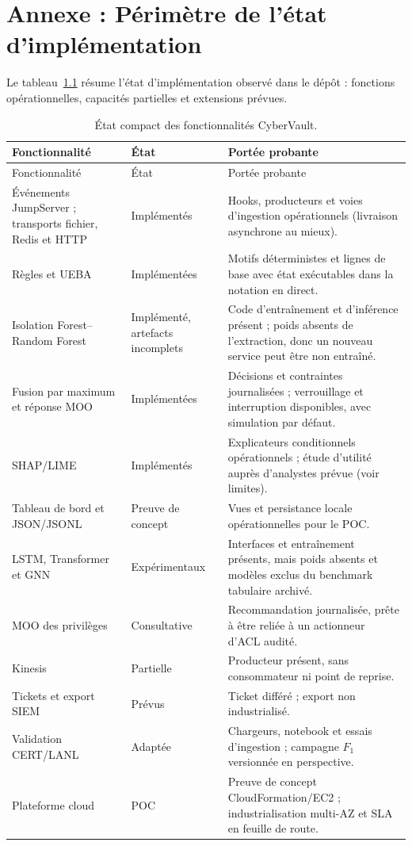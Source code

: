 \documentclass[11pt,a4paper,oneside]{report}
\theoremstyle{definition}
\theoremstyle{plain}
\begin{document}
\label{app:confusion-counts}
\label{tab:app-confusion}

\chapter{Annexe : Périmètre de l'état d'implémentation}
\label{app:status}

Le tableau~\ref{tab:app-status} résume l'état d'implémentation observé dans le
dépôt : fonctions opérationnelles, capacités partielles et extensions prévues.

\begin{longtable}{@{}p{}p{}p{}@{}}
\caption{État compact des fonctionnalités CyberVault.}
\label{tab:app-status}\\
\toprule
Fonctionnalité & État & Portée probante \\
\midrule
\endfirsthead
\toprule
Fonctionnalité & État & Portée probante \\
\midrule
\endhead
Événements JumpServer ; transports fichier, Redis et HTTP &
Implémentés & Hooks, producteurs et voies d'ingestion opérationnels (livraison
asynchrone au mieux). \\
Règles et UEBA & Implémentées & Motifs déterministes et lignes de base avec
état exécutables dans la notation en direct. \\
Isolation Forest--Random Forest & Implémenté, artefacts incomplets & Code
d'entraînement et d'inférence présent ; poids absents de l'extraction, donc un
nouveau service peut être non entraîné. \\
Fusion par maximum et réponse MOO & Implémentées & Décisions et contraintes
journalisées ; verrouillage et interruption disponibles, avec simulation par
défaut. \\
SHAP/LIME & Implémentés & Explicateurs conditionnels opérationnels ; étude
d'utilité auprès d'analystes prévue (voir limites). \\
Tableau de bord et JSON/JSONL & Preuve de concept & Vues et persistance locale
opérationnelles pour le POC. \\
LSTM, Transformer et GNN & Expérimentaux & Interfaces et entraînement présents,
mais poids absents et modèles exclus du benchmark tabulaire archivé. \\
MOO des privilèges & Consultative & Recommandation journalisée, prête à être
reliée à un actionneur d'ACL audité. \\
Kinesis & Partielle & Producteur présent, sans consommateur ni point de reprise. \\
Tickets et export SIEM & Prévus & Ticket différé ; export non industrialisé. \\
Validation CERT/LANL & Adaptée & Chargeurs, notebook et essais d'ingestion ;
campagne $F_1$ versionnée en perspective. \\
Plateforme cloud & POC & Preuve de concept CloudFormation/EC2 ; industrialisation
multi-AZ et SLA en feuille de route. \\
\bottomrule
\end{longtable}
\end{document}
